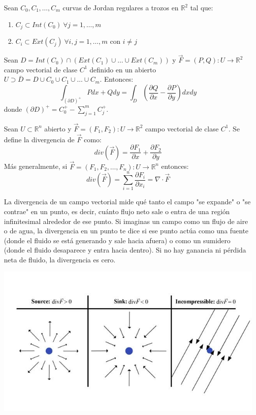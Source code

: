 \begin{teorema} 
    Sean $C_0, C_1, \ldots, C_m$ curvas de Jordan regulares a trozos en $\mathbb{R}^2$ tal que:
    \begin{enumerate}
        \item $C_j \subset Int(C_0) \ \forall j = 1, \ldots, m$
        \item $C_i \subset Ext(C_j) \ \forall i, j = 1, \ldots, m$ con $i \neq j$
    \end{enumerate}
    Sean $D = Int(C_0) \cap \left( Ext(C_1) \cup \ldots \cup Ext(C_m) \right)$ y $\vec{F} = (P, Q) : U \to \mathbb{R}^2$ campo vectorial de clase $C^1$ definido en un abierto $U \supset \overline{D} = D \cup C_0 \cup C_1 \cup \ldots \cup C_m$. Entonces:
    $$\int_{(\partial D)^+} Pdx + Qdy = \int_{D} \left(\frac{\partial Q}{\partial x} - \frac{\partial P}{\partial y}\right) dx dy$$
    donde $(\partial D)^+ = C_0^+ - \sum_{j=1}^{m} C_j^+$.
\end{teorema}

\begin{definición} 
Sean $U \subset \mathbb{R}^n$ abierto y $\vec{F} = (F_1, F_2) : U \to \mathbb{R}^2$ campo vectorial de clase $C^1$. Se define la divergencia de $\vec{F}$ como:
$$div(\vec{F}) = \frac{\partial F_1}{\partial x} + \frac{\partial F_2}{\partial y}$$
Más generalmente, si $\vec{F} = (F_1, F_2, \ldots, F_n) : U \to \mathbb{R}^n$ entonces:
$$div(\vec{F}) = \sum_{i=1}^{n} \frac{\partial F_i}{\partial x_i} = \nabla \cdot \vec{F}$$
\end{definición}

La divergencia de un campo vectorial mide qué tanto el campo "se expande" o "se
contrae" en un punto, es decir, cuánto flujo neto sale o entra de una región
infinitesimal alrededor de ese punto. Si imaginas un campo como un flujo de
aire o de agua, la divergencia en un punto te dice si ese punto actúa como una
fuente (donde el fluido se está generando y sale hacia afuera) o como un
sumidero (donde el fluido desaparece y entra hacia dentro). Si no hay ganancia
ni pérdida neta de fluido, la divergencia es cero.

\begin{center}
    \includegraphics[width=0.5\linewidth]{images/div.jpg}
\end{center}

